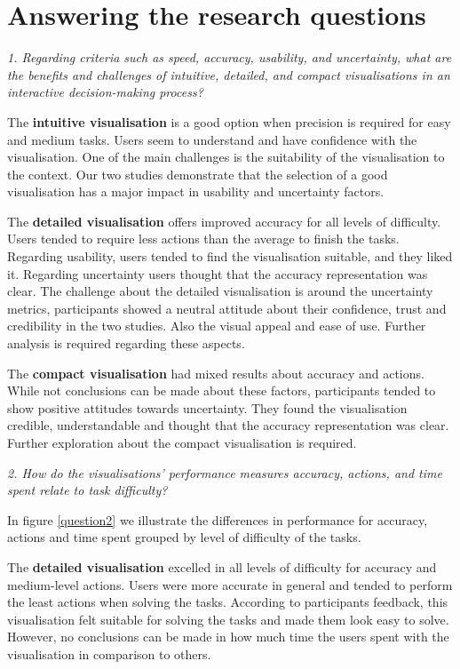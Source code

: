 \documentclass[final,5p,times,twocolumn,authoryear]{elsarticle}
\begin{document}
\section{Answering the research questions} %
\label{sub:researchquestions}

\emph{1. Regarding criteria such as speed, accuracy, usability, and uncertainty, what are the benefits and challenges of intuitive, detailed, and compact visualisations in an interactive decision-making process?}

The \textbf{intuitive visualisation} is a good option when precision is required for easy and medium tasks. Users seem to understand and have confidence with the visualisation. One of the main challenges is the suitability of the visualisation to the context. Our two studies demonstrate that the selection of a good visualisation has a major impact in usability and uncertainty factors.

The \textbf{detailed visualisation} offers improved accuracy for all levels of difficulty. Users tended to require less actions than the average to finish the tasks. Regarding usability, users tended to find the visualisation suitable, and they liked it. Regarding uncertainty users thought that the accuracy representation was clear. The challenge about the detailed visualisation is around the uncertainty metrics, participants showed a neutral attitude about their confidence, trust and credibility in the two studies. Also the visual appeal and ease of use. Further analysis is required regarding these aspects.

The \textbf{compact visualisation} had mixed results about accuracy and actions. While not conclusions can be made about these factors, participants tended to show positive attitudes towards uncertainty. They found the visualisation credible, understandable and thought that the accuracy representation was clear. Further exploration about the compact visualisation is required.


\emph{2. How do the visualisations' performance measures accuracy, actions, and time spent relate to task difficulty?}

In figure \ref{question2} we illustrate the differences in performance for accuracy, actions and time spent grouped by level of difficulty of the tasks.

The \textbf{detailed visualisation} excelled in all levels of difficulty for accuracy and medium-level actions. Users were more accurate in general and tended to perform the least actions when solving the tasks. According to participants feedback, this visualisation felt suitable for solving the tasks and made them look easy to solve. However, no conclusions can be made in how much time the users spent with the visualisation in comparison to others. 
\end{document}
